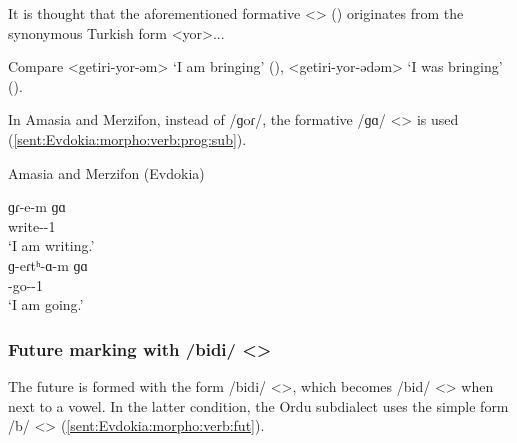 It is thought that the aforementioned formative <> () originates from the synonymous Turkish form <yor>...

\begin{adjarianpage}\label{page:234}\end{adjarianpage}%


Compare <getiri-yor-əm> `I am bringing' (), <getiri-yor-ədəm> `I was bringing' (). 




In Amasia and Merzifon, instead of /ɡoɾ/, the formative /ɡɑ/ <> is used (\ref{sent:Evdokia:morpho:verb:prog:sub}).

\begin{exe}
	\ex Amasia and Merzifon (Evdokia) \label{sent:Evdokia:morpho:verb:prog:sub} 
	\begin{xlist}
		\ex \gll ɡɾ-e-m ɡɑ \\
		write-{\thgloss}-1{\sg} {\prog} \\
		\trans `I am writing.'\\
		\ex \gll ɡ-eɾtʰ-ɑ-m ɡɑ \\
		{\ind}-go-{\thgloss}-1{\sg} {\prog} \\
		\trans `I am going.'\\
		
	\end{xlist}
\end{exe}

\subsubsection{Future marking with /bidi/ <> }
The future is formed with the form /bidi/ <>, which becomes /bid/ <> when next to a vowel. In the latter condition, the Ordu subdialect uses the simple form /b/ <> (\ref{sent:Evdokia:morpho:verb:fut}). 







